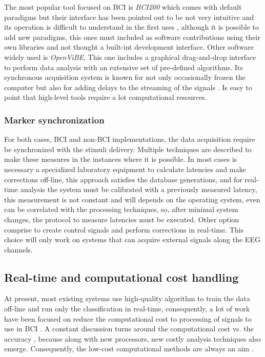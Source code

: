 The most popular tool focused on \gls*{BCI} is \textit{BCI200} which comes with default paradigms but their interface has been pointed out to be not very intuitive and its operation is difficult to understand in the first uses \cite{madrid2014brain}, although it is possible to add new paradigms, this ones must included as software contributions using their own libraries and not thought a built-int development interface. Other software widely used is \textit{OpenViBE}, This one includes a graphical drag-and-drop interface to perform data analysis with an extensive set of pre-defined algorithms. Its synchronous acquisition system is known for not only occasionally frozen the computer but also for adding delays to the streaming of the signals \cite{peterson2020feasibility}. Is easy to point that high-level tools require a lot computational resources.

\subsubsection{Marker synchronization}

For both cases, \gls*{BCI} and non-\gls*{BCI} implementations, the data acquisition require be synchronized with the stimuli delivery. Multiple techniques are described \cite{wilson2010procedure} to make these measures in the instances where it is possible. In most cases is necessary a specialized laboratory equipment \cite{appelhoff2021we, razavi2022opensync} to calculate latencies and make corrections off-line, this approach satisfies the database generations, and for real-time analysis the system must be calibrated with a previously measured latency, this measurement is not constant and will depends on the operating system, even can be correlated with the processing techniques, so, after minimal system changes, the protocol to measure latencies must be executed. Other option comprise to create control signals \cite{davis2020stimulus} and perform corrections in real-time. This choice will only work on systems that can acquire external signals along the \gls*{EEG} channels.

\subsection{Real-time and computational cost handling}

At present, most existing systems use high-quality algorithm to train the data off-line and run only the classification in real-time, consequently, a lot of work have been focused on reduce the computational cost to processing of signals to use in \gls*{BCI} \cite{netzer2020real, hasan2020computationally}. A constant discussion turns around the computational cost vs. the accuracy \cite{ahmadi2012brain}, because along with new processors, new costly analysis techniques also emerge. Consequently, the low-cost computational methods are always an aim \cite{changoluisa2020low}.


